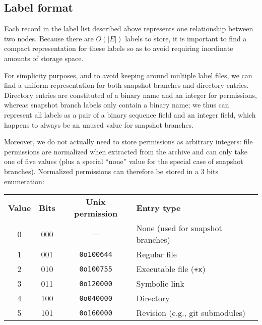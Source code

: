 \subsection{Label format}
\label{sec:label-format}

Each record in the label list described above represents one relationship
between two nodes. Because there are $O(|E|)$ labels to store, it is important
to find a compact representation for these labels so as to avoid requiring
inordinate amounts of storage space.

For simplicity purposes, and to avoid keeping around
multiple label files, we can find a uniform representation for both snapshot
branches and directory entries. Directory entries are constituted of a binary
name and an integer for permissions, whereas snapshot branch labels only
contain a binary name; we thus can represent all labels as a pair of a binary
sequence field and an integer field, which happens to always be an unused value
for snapshot branches.

Moreover, we do not actually need to store permissions as arbitrary integers:
file permissions are normalized when extracted from the archive and can only
take one of five values (plus a special ``none'' value for the special case of
snapshot branches).  Normalized permissions can therefore be stored in a 3 bits
enumeration:

\begin{table}[H]
    \centering
\begin{tabular}{c c c l}
    \textbf{Value} & \textbf{Bits} & \textbf{Unix permission} & \textbf{Entry type} \\
    0 & 000 & --- & None (used for snapshot branches) \\
    1 & 001 & \texttt{0o100644} & Regular file \\
    2 & 010 & \texttt{0o100755} & Executable file (\texttt{+x}) \\
    3 & 011 & \texttt{0o120000} & Symbolic link \\
    4 & 100 & \texttt{0o040000} & Directory \\
    5 & 101 & \texttt{0o160000} & Revision (e.g., git submodules)
\end{tabular}
\end{table}

